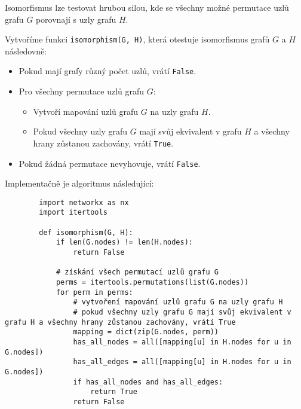 \documentclass[10pt, a4paper]{ReportSheet}
\begin{document}
    \newpage

    Isomorfismus lze testovat hrubou silou, kde se všechny možné permutace uzlů grafu $G$ porovnají s uzly grafu $H$.

    Vytvoříme funkci \texttt{isomorphism(G, H)}, která otestuje isomorfismus grafů $G$ a $H$ následovně:
    \begin{itemize}
        \item Pokud mají grafy různý počet uzlů, vrátí \texttt{False}.
        \item Pro všechny permutace uzlů grafu $G$:
        \begin{itemize}
            \item Vytvoří mapování uzlů grafu $G$ na uzly grafu $H$.
            \item Pokud všechny uzly grafu $G$ mají svůj ekvivalent v grafu $H$ a všechny hrany zůstanou zachovány, vrátí \texttt{True}.
        \end{itemize}
        \item Pokud žádná permutace nevyhovuje, vrátí \texttt{False}.
    \end{itemize}

    Implementačně je algoritmus následující:
    \begin{verbatim}
        import networkx as nx
        import itertools

        def isomorphism(G, H):
            if len(G.nodes) != len(H.nodes):
                return False

            # získání všech permutací uzlů grafu G
            perms = itertools.permutations(list(G.nodes))
            for perm in perms:
                # vytvoření mapování uzlů grafu G na uzly grafu H
                # pokud všechny uzly grafu G mají svůj ekvivalent v grafu H a všechny hrany zůstanou zachovány, vrátí True
                mapping = dict(zip(G.nodes, perm))
                has_all_nodes = all([mapping[u] in H.nodes for u in G.nodes])
                has_all_edges = all([mapping[u] in H.nodes for u in G.nodes])
                if has_all_nodes and has_all_edges:
                    return True
                return False
    \end{verbatim}
\end{document}
